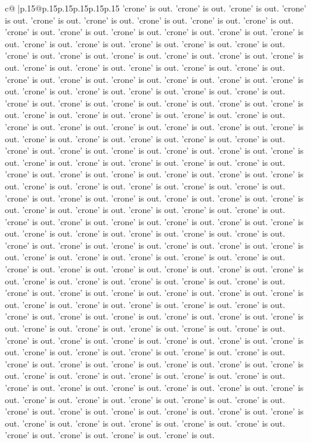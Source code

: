 \documentclass{article}
\begin{document}
{\begin{supertabular}{c@{$\;$}|p{.15\linewidth}@{}p{.15\linewidth}p{.15\linewidth}p{.15\linewidth}p{.15\linewidth}p{.15\linewidth}}
{{{'crone' is out. 'crone' is out. 'crone' is out. 'crone' is out. 'crone' is out. 'crone' is out. 'crone' is out. 'crone' is out. 'crone' is out. 'crone' is out. 'crone' is out. 'crone' is out. 'crone' is out. 'crone' is out. 'crone' is out. 'crone' is out. 'crone' is out. 'crone' is out. 'crone' is out. 'crone' is out. 'crone' is out. 'crone' is out. 'crone' is out. 'crone' is out. 'crone' is out. 'crone' is out. 'crone' is out. 'crone' is out. 'crone' is out. 'crone' is out. 'crone' is out. 'crone' is out. 'crone' is out. 'crone' is out. 'crone' is out. 'crone' is out. 'crone' is out. 'crone' is out. 'crone' is out. 'crone' is out. 'crone' is out. 'crone' is out. 'crone' is out. 'crone' is out. 'crone' is out. 'crone' is out. 'crone' is out. 'crone' is out. 'crone' is out. 'crone' is out. 'crone' is out. 'crone' is out. 'crone' is out. 'crone' is out. 'crone' is out. 'crone' is out. 'crone' is out. 'crone' is out. 'crone' is out. 'crone' is out. 'crone' is out. 'crone' is out. 'crone' is out. 'crone' is out. 'crone' is out. 'crone' is out. 'crone' is out. 'crone' is out. 'crone' is out. 'crone' is out. 'crone' is out. 'crone' is out. 'crone' is out. 'crone' is out. 'crone' is out. 'crone' is out. 'crone' is out. 'crone' is out. 'crone' is out. 'crone' is out. 'crone' is out. 'crone' is out. 'crone' is out. 'crone' is out. 'crone' is out. 'crone' is out. 'crone' is out. 'crone' is out. 'crone' is out. 'crone' is out. 'crone' is out. 'crone' is out. 'crone' is out. 'crone' is out. 'crone' is out. 'crone' is out. 'crone' is out. 'crone' is out. 'crone' is out. 'crone' is out. 'crone' is out. 'crone' is out. 'crone' is out. 'crone' is out. 'crone' is out. 'crone' is out. 'crone' is out. 'crone' is out. 'crone' is out. 'crone' is out. 'crone' is out. 'crone' is out. 'crone' is out. 'crone' is out. 'crone' is out. 'crone' is out. 'crone' is out. 'crone' is out. 'crone' is out. 'crone' is out. 'crone' is out. 'crone' is out. 'crone' is out. 'crone' is out. 'crone' is out. 'crone' is out. 'crone' is out. 'crone' is out. 'crone' is out. 'crone' is out. 'crone' is out. 'crone' is out. 'crone' is out. 'crone' is out. 'crone' is out. 'crone' is out. 'crone' is out. 'crone' is out. 'crone' is out. 'crone' is out. 'crone' is out. 'crone' is out. 'crone' is out. 'crone' is out. 'crone' is out. 'crone' is out. 'crone' is out. 'crone' is out. 'crone' is out. 'crone' is out. 'crone' is out. 'crone' is out. 'crone' is out. 'crone' is out. 'crone' is out. 'crone' is out. 'crone' is out. 'crone' is out. 'crone' is out. 'crone' is out. 'crone' is out. 'crone' is out. 'crone' is out. 'crone' is out. 'crone' is out. 'crone' is out. 'crone' is out. 'crone' is out. 'crone' is out. 'crone' is out. 'crone' is out. 'crone' is out. 'crone' is out. 'crone' is out. 'crone' is out. 'crone' is out. 'crone' is out. 'crone' is out. 'crone' is out. 'crone' is out. 'crone' is out. 'crone' is out. 'crone' is out. 'crone' is out. 'crone' is out. 'crone' is out. 'crone' is out. 'crone' is out. 'crone' is out. 'crone' is out. 'crone' is out. 'crone' is out. 'crone' is out. 'crone' is out. 'crone' is out. 'crone' is out. 'crone' is out. 'crone' is out. 'crone' is out. 'crone' is out. }}}
\end{supertabular}}
\end{document}
